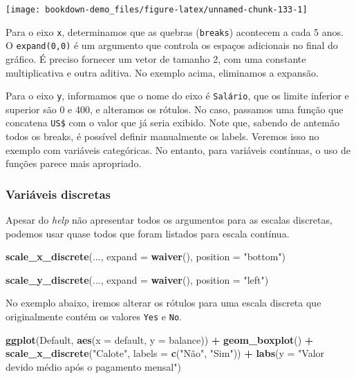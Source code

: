 \documentclass[]{book}
\newenvironment{Shaded}{\begin{snugshade}}{\end{snugshade}}
\newcommand{\KeywordTok}[1]{\textcolor[rgb]{0.13,0.29,0.53}{\textbf{#1}}}
\newcommand{\DataTypeTok}[1]{\textcolor[rgb]{0.13,0.29,0.53}{#1}}
\newcommand{\StringTok}[1]{\textcolor[rgb]{0.31,0.60,0.02}{#1}}
\newcommand{\OperatorTok}[1]{\textcolor[rgb]{0.81,0.36,0.00}{\textbf{#1}}}
\newcommand{\NormalTok}[1]{#1}
\begin{document}
\begin{center}\texttt{[image: bookdown-demo\_files/figure-latex/unnamed-chunk-133-1]} \end{center}

Para o eixo \texttt{x}, determinamos que as quebras (\texttt{breaks})
acontecem a cada 5 anos. O \texttt{expand(0,0)} é um argumento que
controla os espaços adicionais no final do gráfico. É preciso fornecer
um vetor de tamanho 2, com uma constante multiplicativa e outra aditiva.
No exemplo acima, eliminamos a expansão.

Para o eixo \texttt{y}, informamos que o nome do eixo é
\texttt{Salário}, que os limite inferior e superior são 0 e 400, e
alteramos os rótulos. No caso, passamos uma função que concatena
\texttt{US\$} com o valor que já seria exibido. Note que, sabendo de
antemão todos os breaks, é possível definir manualmente os labels.
Veremos isso no exemplo com variáveis categóricas. No entanto, para
variáveis contínuas, o uso de funções parece mais apropriado.

\subsubsection{Variáveis discretas}\label{variaveis-discretas}

Apesar do \emph{help} não apresentar todos os argumentos para as escalas
discretas, podemos usar quase todos que foram listados para escala
contínua.

\begin{Shaded}
\begin{Highlighting}[]
\KeywordTok{scale_x_discrete}\NormalTok{(..., }\DataTypeTok{expand =} \KeywordTok{waiver}\NormalTok{(), }\DataTypeTok{position =} \StringTok{"bottom"}\NormalTok{)}

\KeywordTok{scale_y_discrete}\NormalTok{(..., }\DataTypeTok{expand =} \KeywordTok{waiver}\NormalTok{(), }\DataTypeTok{position =} \StringTok{"left"}\NormalTok{)}
\end{Highlighting}
\end{Shaded}

No exemplo abaixo, iremos alterar os rótulos para uma escala discreta
que originalmente contém os valores \texttt{Yes} e \texttt{No}.

\begin{Shaded}
\begin{Highlighting}[]
\KeywordTok{ggplot}\NormalTok{(Default, }\KeywordTok{aes}\NormalTok{(}\DataTypeTok{x =}\NormalTok{ default, }\DataTypeTok{y =}\NormalTok{ balance)) }\OperatorTok{+}
\StringTok{  }\KeywordTok{geom_boxplot}\NormalTok{() }\OperatorTok{+}\StringTok{ }
\StringTok{  }\KeywordTok{scale_x_discrete}\NormalTok{(}\StringTok{"Calote"}\NormalTok{, }\DataTypeTok{labels =} \KeywordTok{c}\NormalTok{(}\StringTok{"Não"}\NormalTok{, }\StringTok{"Sim"}\NormalTok{)) }\OperatorTok{+}
\StringTok{  }\KeywordTok{labs}\NormalTok{(}\DataTypeTok{y =} \StringTok{"Valor devido médio após o pagamento mensal"}\NormalTok{)}
\end{Highlighting}
\end{Shaded}
\end{document}
